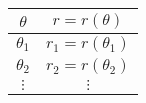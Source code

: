 \begin{minipage}{.48\linewidth}
	\centering
	\begin{tabular}{c|c}
		$\theta$ & $r=r(\theta)$\\
		\hline 
		$\theta_{1}$ & $r_{1}=r\left(\theta_{1}\right)$ \\
		$\theta_{2}$ & $r_{2}=r\left(\theta_{2}\right)$ \\
		$\vdots$ & $\vdots$\\
	\end{tabular}
\end{minipage}
\begin{minipage}{.48\linewidth}

\end{minipage}



